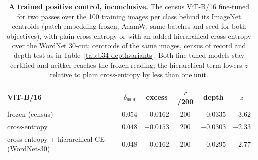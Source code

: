 \begin{table}[H]
\centering
\small
\begin{tabular}{lccccc}
\toprule
ViT-B/16 & $\hat\delta_{99.9}$ & excess & $r$/200 & depth & $z$ \\
\midrule
frozen (census) & $0.054$ & $-0.0162$ & 200 & $-0.0335$ & $-3.62$ \\
cross-entropy & $0.048$ & $-0.0153$ & 200 & $-0.0303$ & $-2.33$ \\
cross-entropy + hierarchical CE (WordNet-30) & $0.048$ & $-0.0162$ & 200 & $-0.0295$ & $-2.77$ \\
\bottomrule
\end{tabular}
\caption{\textbf{A trained positive control, inconclusive.} The census ViT-B/16 fine-tuned for two passes over the 100 training images per class behind its ImageNet centroids (patch embedding frozen, AdamW, same batches and seed for both objectives), with plain cross-entropy or with an added hierarchical cross-entropy over the WordNet 30-cut; centroids of the same images, census of record and depth test as in Table~\ref{tab:b34-depthvariants}. Both fine-tuned models stay certified and neither reaches the frozen reading; the hierarchical term lowers $z$ relative to plain cross-entropy by less than one unit. %
}
\label{tab:b39-finetune}
\end{table}
